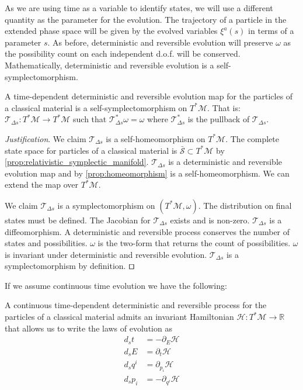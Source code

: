 \documentclass[smallextended]{svjour3}
\numberwithin{equation}{section}
\newenvironment{justification}{\emph{Justification}.}{\hfill\(\qed\)}
\begin{document}
As we are using time as a variable to identify states, we will use a different quantity as the parameter for the evolution. The trajectory of a particle in the extended phase space will be given by the evolved variables $\xi^a(s)$ in terms of a parameter $s$. As before, deterministic and reversible evolution will preserve $\omega$ as the possibility count on each independent d.o.f. will be conserved. Mathematically, deterministic and reversible evolution is a self-symplectomorphism.

\begin{prop}\label{prop:relativistic_symplectomorphism}
	A time-dependent deterministic and reversible evolution map for the particles of a classical material is a self-symplectomorphism on $T^*\mathcal{M}$. That is: $\mathcal{T}_{\Delta s}: T^*\mathcal{M} \rightarrow T^*\mathcal{M}$ such that $\mathcal{T}_{\Delta s}^*\omega = \omega$ where $\mathcal{T}_{\Delta s}^*$ is the pullback of $\mathcal{T}_{\Delta s}$.
\end{prop}

\begin{justification}
	We claim $\mathcal{T}_{\Delta s}$ is a self-homeomorphism on $T^*\mathcal{M}$. The complete state space for particles of a classical material is $\bar{\mathcal{S}} \subset T^*\mathcal{M}$ by \ref{prop:relativistic_symplectic_manifold}. $\mathcal{T}_{\Delta s}$ is a deterministic and reversible evolution map and by \ref{prop:homeomorphism} is a self-homeomorphism. We can extend the map over $T^*\mathcal{M}$.
	
	We claim $\mathcal{T}_{\Delta s}$ is a symplectomorphism on $(T^*\mathcal{M}, \omega)$. The distribution on final states must be defined. The Jacobian for $\mathcal{T}_{\Delta s}$ exists and is non-zero. $\mathcal{T}_{\Delta s}$ is a diffeomorphism. A deterministic and reversible process conserves the number of states and possibilities. $\omega$ is the two-form that returns the count of possibilities. $\omega$ is invariant under deterministic and reversible evolution. $\mathcal{T}_{\Delta s}$ is a symplectomorphism by definition.
\end{justification}

If we assume continuous time evolution we have the following:

\begin{prop}\label{prop:relativistic_hamiltons_equations}
	A continuous time-dependent deterministic and reversible process for the particles of a classical material admits an invariant Hamiltonian $\mathcal{H}: T^*\mathcal{M} \rightarrow \mathbb{R}$ that allows us to write the laws of evolution as
	\begin{align*}
	d_{s}t &= - \partial_{E} \mathcal{H} \\
	d_{s}E &= \partial_{t} \mathcal{H} \\
	d_{s}q^i &= \partial_{p_i} \mathcal{H} \\
	d_{s}p_i &= - \partial_{q^i} \mathcal{H}
	\end{align*}
\end{prop}
\end{document}
